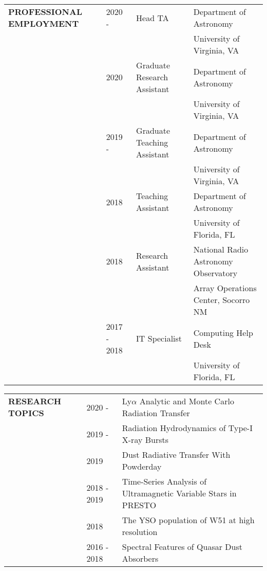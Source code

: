 \documentclass{article}
\begin{document}
\vspace{0.5cm}
\begin{tabular}{p{4cm}p{2.2cm}ll}
    \large{\textbf{PROFESSIONAL EMPLOYMENT}}
    &2020 - & Head TA            & Department of Astronomy \vspace{-0.45cm} \\
    &       &                    & \small University of Virginia, VA \vspace{0.125cm} \\ 
    &2020   & Graduate Research Assistant & Department of Astronomy \\
    &       &                    & \small University of Virginia, VA \vspace{0.125cm} \\ 
    &2019 - & Graduate Teaching Assistant & Department of Astronomy \\
    &       &                    & \small University of Virginia, VA \vspace{0.125cm} \\ 
    &2018   & Teaching Assistant & Department of Astronomy \\
    &       &                    & \small University of Florida, FL \vspace{0.125cm} \\ 
    &2018   & Research Assistant & National Radio Astronomy Observatory \\
    &       &                    & \small Array Operations Center, Socorro NM \vspace{0.125cm} \\ 
    &2017 - 2018 & IT Specialist & Computing Help Desk \\
    &       &                    & \small University of Florida, FL \vspace{0.125cm} \\ 
\end{tabular}
\vspace{0.5cm}





\begin{tabular}{p{4cm}p{2.2cm}l}
    \large{\textbf{RESEARCH \newline TOPICS}}&2020 - & Ly$\alpha$ Analytic and Monte Carlo Radiation Transfer \vspace{-0.45cm}\\
    &2019 - & Radiation Hydrodynamics of Type-I X-ray Bursts\\
    &2019 & Dust Radiative Transfer With Powderday \\
    &2018 - 2019 & Time-Series Analysis of Ultramagnetic Variable Stars in PRESTO\\
    &2018 & The YSO population of W51 at high resolution \\
    &2016 - 2018 & Spectral Features of Quasar Dust Absorbers \\
\end{tabular}
\vspace{0.5cm}
\end{document}

